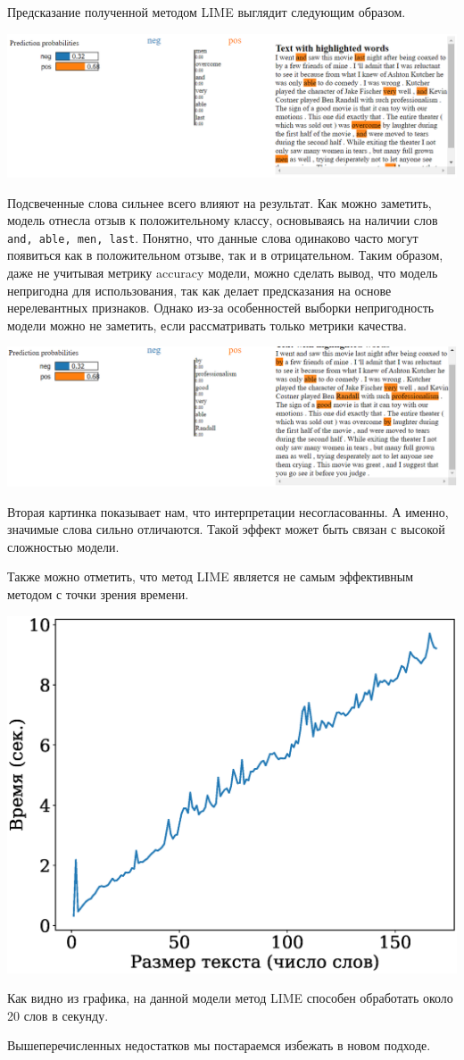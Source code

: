 \documentclass[12pt]{article}
\begin{document}
Предсказание полученной методом LIME выглядит следующим образом.

\includegraphics[width=\textwidth]{figures/lime_exp.png}

Подсвеченные слова сильнее всего влияют на результат. Как можно заметить, модель отнесла отзыв к положительному классу, основываясь на наличии слов \texttt{and, able, men, last}. Понятно, что данные слова одинаково часто могут появиться как в положительном отзыве, так и в отрицательном. Таким образом, даже не учитывая метрику accuracy модели, можно сделать вывод, что модель непригодна для использования, так как делает предсказания на основе нерелевантных признаков. Однако из-за особенностей выборки непригодность модели можно не заметить, если рассматривать только метрики качества. 

\includegraphics[width=\textwidth]{figures/lime_exp2.png}

Вторая картинка показывает нам, что интерпретации несогласованны. А именно, значимые слова сильно отличаются. Такой эффект может быть связан с высокой сложностью модели.

Также можно отметить, что метод LIME является не самым эффективным методом с точки зрения времени.

\includegraphics[width=\textwidth]{../figures/lime_time}

Как видно из графика, на данной модели метод LIME способен обработать около 20 слов в секунду.

Вышеперечисленных недостатков мы постараемся избежать в новом подходе.



\end{document}
